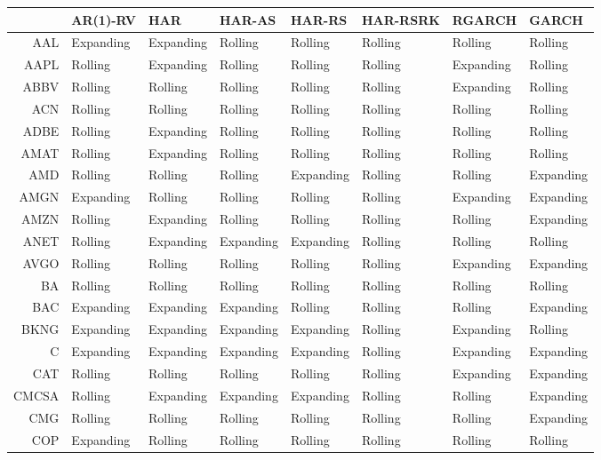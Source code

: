 \begin{table}[ht]
\centering
\begin{tabular}{rlllllll}
  \hline
 & AR(1)-RV & HAR & HAR-AS & HAR-RS & HAR-RSRK & RGARCH & GARCH \\ 
  \hline
AAL & Expanding & Expanding & Rolling & Rolling & Rolling & Rolling & Rolling \\ 
  AAPL & Rolling & Expanding & Rolling & Rolling & Rolling & Expanding & Rolling \\ 
  ABBV & Rolling & Rolling & Rolling & Rolling & Rolling & Expanding & Rolling \\ 
  ACN & Rolling & Rolling & Rolling & Rolling & Rolling & Rolling & Rolling \\ 
  ADBE & Rolling & Expanding & Rolling & Rolling & Rolling & Rolling & Rolling \\ 
  AMAT & Rolling & Expanding & Rolling & Rolling & Rolling & Rolling & Rolling \\ 
  AMD & Rolling & Rolling & Rolling & Expanding & Rolling & Rolling & Expanding \\ 
  AMGN & Expanding & Rolling & Rolling & Rolling & Rolling & Expanding & Expanding \\ 
  AMZN & Rolling & Expanding & Rolling & Rolling & Rolling & Rolling & Expanding \\ 
  ANET & Rolling & Expanding & Expanding & Expanding & Rolling & Rolling & Rolling \\ 
  AVGO & Rolling & Rolling & Rolling & Rolling & Rolling & Expanding & Expanding \\ 
  BA & Rolling & Rolling & Rolling & Rolling & Rolling & Rolling & Rolling \\ 
  BAC & Expanding & Expanding & Expanding & Rolling & Rolling & Rolling & Expanding \\ 
  BKNG & Expanding & Expanding & Expanding & Expanding & Rolling & Expanding & Rolling \\ 
  C & Expanding & Expanding & Expanding & Expanding & Rolling & Expanding & Expanding \\ 
  CAT & Rolling & Rolling & Rolling & Rolling & Rolling & Expanding & Expanding \\ 
  CMCSA & Rolling & Expanding & Expanding & Expanding & Rolling & Rolling & Expanding \\ 
  CMG & Rolling & Rolling & Rolling & Rolling & Rolling & Rolling & Expanding \\ 
  COP & Expanding & Rolling & Rolling & Rolling & Rolling & Rolling & Rolling \\ 

\end{tabular}
\end{table}
